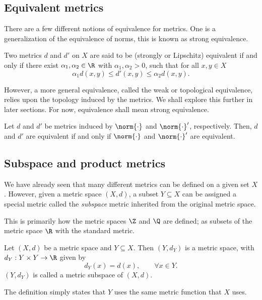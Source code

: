 \subsection{Equivalent metrics}
There are a few different notions of equivalence for metrics. One is a generalization of the equivalence of norms, this is known as strong equivalence.
\begin{ndfn}
  Two metrics $d$ and $d'$ on $X$ are said to be (strongly or Lipschitz) equivalent if and only if there exist $\alpha_1, \alpha_2 \in \R$ with $\alpha_1, \alpha_2 > 0$, such that for all $x,y \in X$
  \begin{equation*}
    \alpha_1 d(x,y) \leq d'(x,y) \leq \alpha_2 d(x,y).
  \end{equation*}
\end{ndfn}
However, a more general equivalence, called the weak or topological equivalence, relies upon the topology induced by the metrics. We shall explore this further in later sections. For now, equivalence shall mean strong equivalence.

\begin{nlemma}
  Let $d$ and $d'$ be metrics induced by $\norm{\cdot}$ and $\norm{\cdot}'$, respectively. Then, $d$ and $d'$ are equivalent if and only if $\norm{\cdot}$ and $\norm{\cdot}'$ are equivalent.
\end{nlemma}

\subsection{Subspace and product metrics}
We have already seen that many different metrics can be defined on a given set $X$. However, given a metric space $(X,d)$, a subset $Y \subseteq X$ can be assigned a special metric called the \emph{subspace} metric inherited from the original metric space.

This is primarily how the metric spaces $\Z$ and $\Q$ are defined; as subsets of the metric space $\R$ with the standard metric.
\begin{nthm}
  Let $(X,d)$ be a metric space and $Y \subseteq X$. Then $(Y,d_Y)$ is a metric space, with $d_Y : Y \times Y \to \R$ given by
  \begin{equation*}
    d_{Y}(x) = d(x), \qquad \forall x \in Y.
  \end{equation*}
  $(Y, d_Y)$ is called a metric subspace of $(X,d)$.
\end{nthm}
The definition simply states that $Y$ uses the same metric function that $X$ uses.

